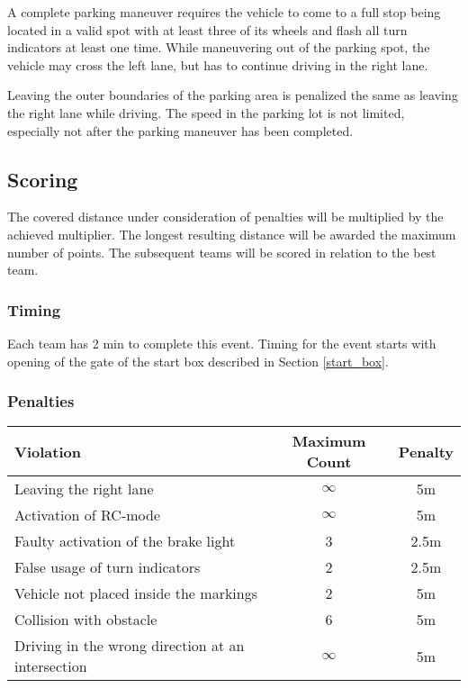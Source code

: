 A complete parking maneuver requires the vehicle to come to a full stop being
located in a valid spot with at least three of its wheels and flash all turn
indicators at least one time. While maneuvering out of the parking spot, the
vehicle may cross the left lane, but has to continue driving in the right lane.

Leaving the outer boundaries of the parking area is penalized the same as
leaving the right lane while driving. The speed in the parking lot is not
limited, especially not after the parking maneuver has been completed.

\subsection{Scoring}
\label{freedrive_scoring}

The covered distance under consideration of penalties will be multiplied by the
achieved multiplier. The longest resulting distance will be awarded the maximum
number of points. The subsequent teams will be scored in relation to the best
team.

\subsubsection{Timing}

Each team has 2 min to complete this event. Timing for the event starts with
opening of the gate of the start box described in Section \ref{start_box}.

\subsubsection{Penalties}
\label{freedrive_penalties}

\begin{table}[H]
	\begin{tabular}{@{}lcc@{}}
		\toprule
		\textbf{Violation}                                & \textbf{Maximum Count} & \textbf{Penalty} \\ \midrule
		Leaving the right lane                            & $\infty$               & 5m               \\
		Activation of RC-mode                             & $\infty$               & 5m               \\
		Faulty activation of the brake light              & 3                      & 2.5m             \\
		False usage of turn indicators                    & 2                      & 2.5m             \\
		Vehicle not placed inside the markings            & 2                      & 5m               \\
		Collision with obstacle                           & 6                      & 5m               \\
		Driving in the wrong direction at an intersection & $\infty$               & 5m               \\
		\bottomrule
	\end{tabular}
\end{table}


